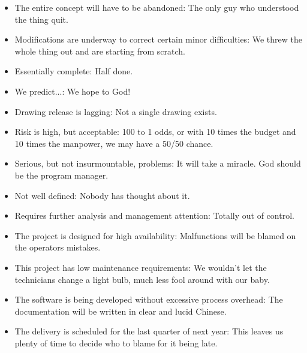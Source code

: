\begin{itemize}
		\item The entire concept will have to be abandoned: The only guy who understood the thing quit. 
	
		\item Modifications are underway to correct certain minor difficulties: We threw the whole thing out and are starting from scratch. 
	
		\item Essentially complete: Half done. 
	
		\item We predict...: We hope to God! 
	
		\item Drawing release is lagging: Not a single drawing exists. 
	
		\item Risk is high, but acceptable: 100 to 1 odds, or with 10 times the budget and 10 times the manpower, we may have a 50/50 chance. 
	
		\item Serious, but not insurmountable, problems: It will take a miracle. God should be the program manager. 
	
		\item Not well defined: Nobody has thought about it. 
	
		\item Requires further analysis and management attention: Totally out of control. 
	
		\item The project is designed for high availability: Malfunctions will be blamed on the operators mistakes. 
	
		\item This project has low maintenance requirements: We wouldn't let the technicians change a light bulb, much less fool around with our baby. 
	
		\item The software is being developed without excessive process overhead: The documentation will be written in clear and lucid Chinese. 
	
		\item The delivery is scheduled for the last quarter of next year: This leaves us plenty of time to decide who to blame for it being late. 
	\end{itemize}
	
	\begin{center}\underline{\hspace{5 cm}}\end{center}

